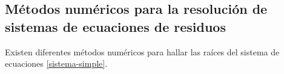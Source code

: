 
\subsection*{Métodos numéricos para la resolución de sistemas de ecuaciones de residuos}
\label{1:metodos}

Existen diferentes métodos numéricos para hallar las raíces del sistema de ecuaciones \ref{sistema-simple}.

